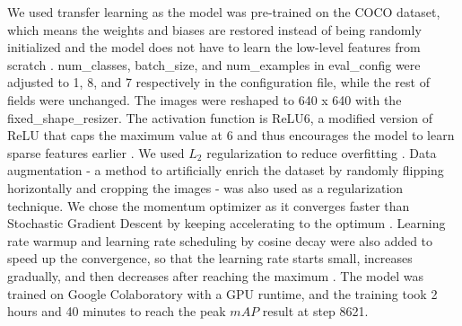 \documentclass[a4paper, 11pt, oneside]{article}
\begin{document}
We used transfer learning \cite{torrey2010transfer} as the model was pre-trained on the COCO dataset, which means the
weights and biases are restored instead of being randomly initialized and the model does not have to learn the low-level
features from scratch \cite{geron2019hands}. num\_classes, batch\_size, and num\_examples in eval\_config were adjusted
to 1, 8, and 7 respectively in the configuration file, while the rest of fields were unchanged. The images were reshaped
to 640 x 640 with the fixed\_shape\_resizer. The activation function is ReLU6, a modified version of ReLU that caps
the maximum value at 6 and thus encourages the model to learn sparse features earlier
\cite{krizhevsky2010convolutional}. We used $L_2$ regularization \cite{ng2004feature} to reduce overfitting
\cite{hawkins2004problem}. Data augmentation \cite{krizhevsky2012imagenet} - a method to artificially enrich the
dataset by randomly flipping horizontally and cropping the images - was also used as a regularization technique.
We chose the momentum optimizer \cite{polyak1964some} as it converges faster than Stochastic Gradient Descent
\cite{bottou2010large} by keeping accelerating to the optimum \cite{geron2019hands}. Learning rate warmup and learning
rate scheduling by cosine decay were also added to speed up the convergence, so that the learning rate starts small,
increases gradually, and then decreases after reaching the maximum
\cite{geron2019hands, goyal2017accurate, senior2013empirical, loshchilov2016sgdr}.
The model was trained on Google Colaboratory \cite{colab} with a GPU runtime, and the training took 2 hours and 40
minutes to reach the peak $mAP$ result at step 8621.
\end{document}
